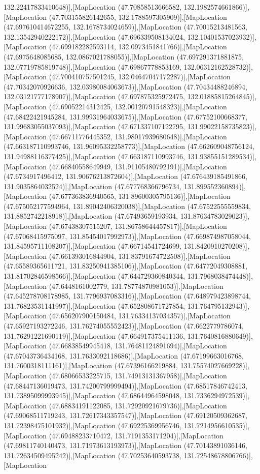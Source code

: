 132.22417833410648)],[MapLocation (47.70858513666582, 132.1982574661866)],[MapLocation (47.703155826142655, 132.1788597305909)],[MapLocation (47.697610414672255, 132.1678734024659)],[MapLocation (47.70015213481563, 132.13542940222172)],[MapLocation (47.696339508134024, 132.10401537023932)],[MapLocation (47.699182282593114, 132.0973451841766)],[MapLocation (47.6975648085685, 132.0867021788055)],[MapLocation (47.697291371881875, 132.07719785819748)],[MapLocation (47.69867778853169, 132.06312162528732)],[MapLocation (47.700410757501245, 132.04647047172287)],[MapLocation (47.70342070926636, 132.03980084063673)],[MapLocation (47.70434488246894, 132.03121777178907)],[MapLocation (47.697875325972475, 132.01885815264845)],[MapLocation (47.69052214312425, 132.00120791548323)],[MapLocation (47.68422421945284, 131.99931964033675)],[MapLocation (47.67752100668377, 131.99683055037093)],[MapLocation (47.671337107122795, 131.99022158735823)],[MapLocation (47.66711776445352, 131.98017939680648)],[MapLocation (47.663187110993746, 131.96095332258773)],[MapLocation (47.662609048756124, 131.94988116377425)],[MapLocation (47.663187110993746, 131.93855151289534)],[MapLocation (47.66840558649949, 131.91105480792191)],[MapLocation (47.6734917496412, 131.90676213872604)],[MapLocation (47.676439185491866, 131.9035864032524)],[MapLocation (47.677768366796734, 131.899552360894)],[MapLocation (47.677363836940565, 131.89600305795136)],[MapLocation (47.675052177594964, 131.89042406320038)],[MapLocation (47.67522555559834, 131.8852742218918)],[MapLocation (47.67493659193934, 131.87634783029023)],[MapLocation (47.67438307515207, 131.86758644457817)],[MapLocation (47.67068415975097, 131.85454017992973)],[MapLocation (47.669874987058044, 131.84595711108207)],[MapLocation (47.66714541724699, 131.8420910270208)],[MapLocation (47.661393016844904, 131.83791674722508)],[MapLocation (47.65589365611721, 131.83250941385106)],[MapLocation (47.64772049308881, 131.81702846598566)],[MapLocation (47.644729360840344, 131.7968038474448)],[MapLocation (47.6448161002779, 131.78774870981053)],[MapLocation (47.645278708178985, 131.7796937083316)],[MapLocation (47.648979423898744, 131.76823531141997)],[MapLocation (47.652808671727854, 131.764795132943)],[MapLocation (47.656207900150484, 131.76334137034357)],[MapLocation (47.65927193272246, 131.76274055552423)],[MapLocation (47.6622779786074, 131.76291221690119)],[MapLocation (47.664917375411136, 131.7640816880649)],[MapLocation (47.66838549945418, 131.76481124891694)],[MapLocation (47.67043736434168, 131.7633092118686)],[MapLocation (47.67199663016768, 131.7600318111161)],[MapLocation (47.67396166219884, 131.75574027669228)],[MapLocation (47.68066533225715, 131.74913131367958)],[MapLocation (47.68447136019473, 131.74200799999494)],[MapLocation (47.68517846742413, 131.73895099993945)],[MapLocation (47.68644964598048, 131.7336294972539)],[MapLocation (47.68834191122085, 131.72920921679736)],[MapLocation (47.69068511719243, 131.72617343357547)],[MapLocation (47.69120509362687, 131.72398475101932)],[MapLocation (47.69225369956746, 131.7214956610535)],[MapLocation (47.69488233710472, 131.7191353171204)],[MapLocation (47.69811740140473, 131.71973613193973)],[MapLocation (47.70143891036146, 131.72634509495242)],[MapLocation (47.70253640593738, 131.72548678806766)],[MapLocation 